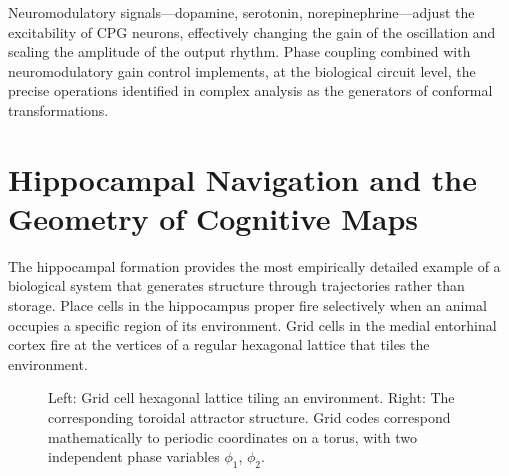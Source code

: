 \documentclass[11pt, a4paper]{article}
\theoremstyle{plain}
\theoremstyle{definition}
\theoremstyle{remark}
\begin{document}
Neuromodulatory signals---dopamine, serotonin, norepinephrine---adjust the excitability
of CPG neurons, effectively changing the gain of the oscillation and scaling the
amplitude of the output rhythm. Phase coupling combined with neuromodulatory gain
control implements, at the biological circuit level, the precise operations identified
in complex analysis as the generators of conformal transformations.


\section{Hippocampal Navigation and the Geometry of Cognitive Maps}

The hippocampal formation provides the most empirically detailed example of a biological
system that generates structure through trajectories rather than storage. Place cells in
the hippocampus proper fire selectively when an animal occupies a specific region of its
environment. Grid cells in the medial entorhinal cortex fire at the vertices of a
regular hexagonal lattice that tiles the environment.

\begin{figure}[h]
\centering
{}
\caption{Left: Grid cell hexagonal lattice tiling an environment.
Right: The corresponding toroidal attractor structure. Grid codes correspond
mathematically to periodic coordinates on a torus, with two independent phase
variables $\phi_1$, $\phi_2$.}
\end{figure}
\end{document}
